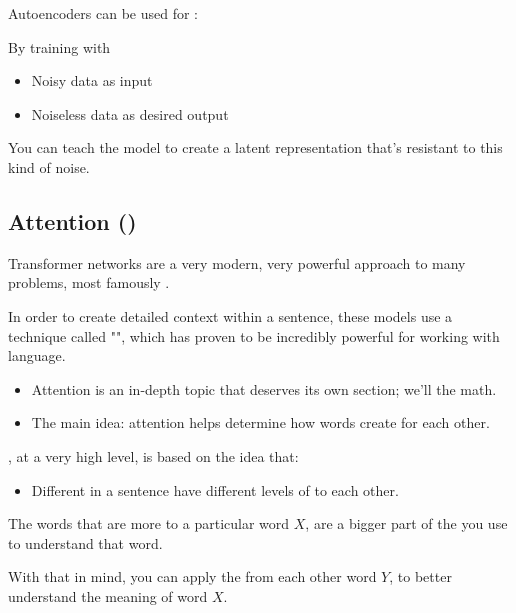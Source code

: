         \begin{concept}
            Autoencoders can be used for :

            By training with 

            \begin{itemize}
                \item Noisy data as input
                \item Noiseless data as desired output
            \end{itemize}

            You can teach the model to create a latent representation that's resistant to this kind of noise.
        \end{concept}

    \pagebreak

    \subsection{Attention ()}

        Transformer networks are a very modern, very powerful approach to many problems, most famously .

        In order to create detailed context within a sentence, these models use a technique called "", which has proven to be incredibly powerful for working with language.

        \begin{itemize}
            \item Attention is an in-depth topic that deserves its own section; we'll  the math.
            \item The main idea: attention helps determine how words create  for each other.
                \\
        \end{itemize}

        \begin{concept}
            , at a very high level, is based on the idea that:

            \begin{itemize}
                \item Different  in a sentence have different levels of  to each other.
            \end{itemize}

            The words that are more  to a particular word $X$, are a bigger part of the  you use to understand that word.

            With that in mind, you can apply the  from each other word $Y$, to better understand the meaning of word $X$.
        \end{concept}


